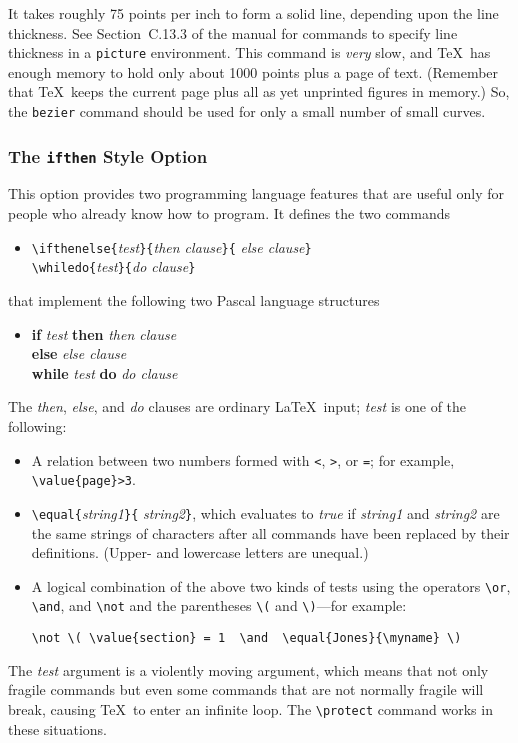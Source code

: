 It takes roughly 75 points per inch to form a solid line, depending
upon the line thickness.  See Section~C.13.3 of the manual for commands
to specify line thickness in a {\tt picture} environment.  This command
is {\em very\/} slow, and \TeX\ has enough memory to hold only about
1000 points plus a page of text.  (Remember that \TeX\ keeps the
current page plus all as yet unprinted figures in memory.) So, the
\verb|bezier| command should be used for only a small number of small
curves.


\subsubsection{The {\tt ifthen} Style Option}

This option provides two programming language features that are useful
only for people who already know how to program.  It defines the
two commands
\begin{itemize} 
\item[]
\verb|\ifthenelse{|{\em test\/}\verb|}{|{\em then clause\/}\verb|}{|%
{\em else clause\/}\verb|}|\\
\verb|\whiledo{|{\em test\/}\verb|}{|{\em do clause\/}\verb|}|
\end{itemize}
that implement the following two Pascal language structures
\begin{itemize}
\item[]
\begin{tabbing}
{\bf if} {\em test\/} \= {\bf then} \= {\em then clause\/} \\
 \> {\bf else} \> {\em else clause\/} \\[2pt]
{\bf while} {\em test\/} {\bf do} {\em do clause\/}
\end{tabbing}
\end{itemize}
The {\em then\/}, {\em else\/}, and {\em do\/} clauses
are ordinary \LaTeX\ input; {\em test\/} is one of the following:
\begin{itemize}
 \item A relation between two numbers formed with {\tt <}, {\tt >},
or {\tt =}; for example, \hbox{\verb|\value{page}>3|}.
 \item \verb|\equal{|{\em string1\/}\verb|}{|%
{\em string2\/}\verb|}|, which evaluates to {\em true\/} if {\em
string1\/} and {\em string2\/} are the same strings of characters after
all commands have been replaced by their definitions.  (Upper- and
lowercase letters are unequal.)
 \item A logical combination of the above two kinds of tests
    using the operators \hbox{\verb|\or|}, \hbox{\verb|\and|},
    and \hbox{\verb|\not|} and the parentheses \hbox{\verb|\(|}
    and \hbox{\verb|\)|}---for example:
\begin{verbatim}
\not \( \value{section} = 1  \and  \equal{Jones}{\myname} \)
\end{verbatim}
\end{itemize}
The {\em test\/} argument is a violently moving argument, which means
that not only fragile commands but even some commands that are not
normally fragile will break, causing \TeX\ to enter an infinite loop.
The \verb|\protect| command works in these situations.

